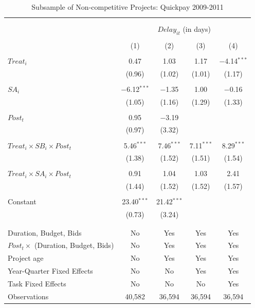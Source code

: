 \documentclass[]{article}
\begin{document}
\begin{table}[H] \centering 
  \caption{Subsample of Non-competitive Projects: Quickpay 2009-2011} 
  \label{} 
\small 
\begin{tabular}{@{\extracolsep{-2pt}}lcccc} 
\\[-1.8ex]\hline 
\hline \\[-1.8ex] 
\\[-1.8ex] & \multicolumn{4}{c}{$Delay_{it}$ (in days)} \\ 
\\[-1.8ex] & (1) & (2) & (3) & (4)\\ 
\hline \\[-1.8ex] 
 $Treat_i$ & 0.47 & 1.03 & 1.17 & $-$4.14$^{***}$ \\ 
  & (0.96) & (1.02) & (1.01) & (1.17) \\ 
  & & & & \\ 
 $SA_i$ & $-$6.12$^{***}$ & $-$1.35 & 1.00 & $-$0.16 \\ 
  & (1.05) & (1.16) & (1.29) & (1.33) \\ 
  & & & & \\ 
 $Post_t$ & 0.95 & $-$3.19 &  &  \\ 
  & (0.97) & (3.32) &  &  \\ 
  & & & & \\ 
 $Treat_i \times SB_i \times Post_t$ & 5.46$^{***}$ & 7.46$^{***}$ & 7.11$^{***}$ & 8.29$^{***}$ \\ 
  & (1.38) & (1.52) & (1.51) & (1.54) \\ 
  & & & & \\ 
 $Treat_i \times SA_i \times Post_t$ & 0.91 & 1.04 & 1.03 & 2.41 \\ 
  & (1.44) & (1.52) & (1.52) & (1.57) \\ 
  & & & & \\ 
 Constant & 23.40$^{***}$ & 21.42$^{***}$ &  &  \\ 
  & (0.73) & (3.24) &  &  \\ 
  & & & & \\ 
\hline \\[-1.8ex] 
Duration, Budget, Bids & No & Yes & Yes & Yes \\ 
$Post_t \times $  (Duration, Budget, Bids) & No & Yes & Yes & Yes \\ 
Project age & No & Yes & Yes & Yes \\ 
Year-Quarter Fixed Effects & No & No & Yes & Yes \\ 
Task Fixed Effects & No & No & No & Yes \\ 
Observations & 40,582 & 36,594 & 36,594 & 36,594 \\ 

\end{tabular}
\end{table}
\end{document}
